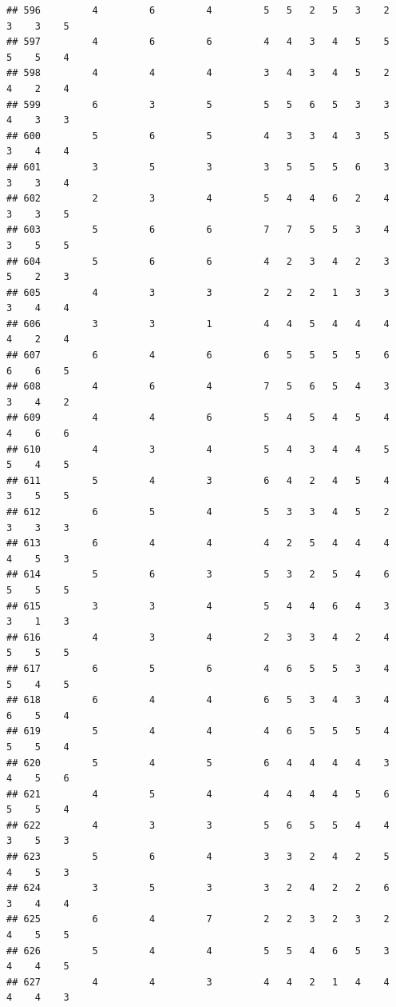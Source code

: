 \documentclass[
]{article}
\begin{document}
\begin{verbatim}
## 596         4         6         4         5   5   2   5   3    2    3    3    5
## 597         4         6         6         4   4   3   4   5    5    5    5    4
## 598         4         4         4         3   4   3   4   5    2    4    2    4
## 599         6         3         5         5   5   6   5   3    3    4    3    3
## 600         5         6         5         4   3   3   4   3    5    3    4    4
## 601         3         5         3         3   5   5   5   6    3    3    3    4
## 602         2         3         4         5   4   4   6   2    4    3    3    5
## 603         5         6         6         7   7   5   5   3    4    3    5    5
## 604         5         6         6         4   2   3   4   2    3    5    2    3
## 605         4         3         3         2   2   2   1   3    3    3    4    4
## 606         3         3         1         4   4   5   4   4    4    4    2    4
## 607         6         4         6         6   5   5   5   5    6    6    6    5
## 608         4         6         4         7   5   6   5   4    3    3    4    2
## 609         4         4         6         5   4   5   4   5    4    4    6    6
## 610         4         3         4         5   4   3   4   4    5    5    4    5
## 611         5         4         3         6   4   2   4   5    4    3    5    5
## 612         6         5         4         5   3   3   4   5    2    3    3    3
## 613         6         4         4         4   2   5   4   4    4    4    5    3
## 614         5         6         3         5   3   2   5   4    6    5    5    5
## 615         3         3         4         5   4   4   6   4    3    3    1    3
## 616         4         3         4         2   3   3   4   2    4    5    5    5
## 617         6         5         6         4   6   5   5   3    4    5    4    5
## 618         6         4         4         6   5   3   4   3    4    6    5    4
## 619         5         4         4         4   6   5   5   5    4    5    5    4
## 620         5         4         5         6   4   4   4   4    3    4    5    6
## 621         4         5         4         4   4   4   4   5    6    5    5    4
## 622         4         3         3         5   6   5   5   4    4    3    5    3
## 623         5         6         4         3   3   2   4   2    5    4    5    3
## 624         3         5         3         3   2   4   2   2    6    3    4    4
## 625         6         4         7         2   2   3   2   3    2    4    5    5
## 626         5         4         4         5   5   4   6   5    3    4    4    5
## 627         4         4         3         4   4   2   1   4    4    4    4    3

\end{verbatim}
\end{document}
